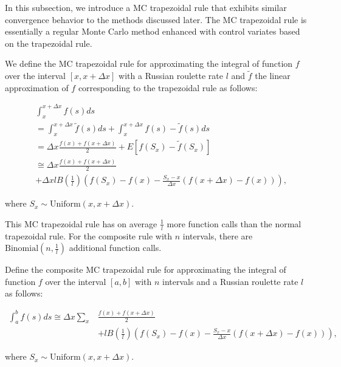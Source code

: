 \documentclass[a4paper,12pt]{article}
\begin{document}
In this subsection, we introduce a MC trapezoidal rule that
exhibits similar convergence behavior to the methods discussed later.
The MC trapezoidal rule is essentially a regular Monte Carlo method
enhanced with control variates based on the trapezoidal rule.

\begin{definition}
    We define the MC trapezoidal rule for approximating the integral
    of function $f$ over the interval $[x, x+\Delta x]$ with a Russian roulette rate
    $l$ and $\tilde{f}$ the linear approximation of $f$ corresponding
    to the trapezoidal rule as follows:

    \begin{align}
         & \int_{x}^{x+\Delta x} f(s) ds                 \\
         & = \int_{x}^{x+\Delta x}  \tilde{f}(s) ds +
        \int_{x}^{x+\Delta x}  f(s) - \tilde{f}(s) ds    \\
         & = \Delta x \frac{f(x) + f(x+\Delta x)}{2}
        + E \left[f(S_x) - \tilde{f}(S_x)\right]         \\
         & \cong \Delta x \frac{f(x) + f(x+\Delta x)}{2} \\
         & + \Delta x l B\left( \frac{1}{l}\right)
        \left(f(S_x) - f(x) - \frac{S_x - x}{\Delta x}
        \left(f(x+\Delta x) - f(x)\right) \right),
    \end{align}

    where $S_x \sim \text{Uniform}(x,x+\Delta x)$.
\end{definition}


This MC trapezoidal rule has on average $\frac{1}{l}$ more function calls than
the normal trapezoidal rule. For the composite rule with $n$ intervals,
there are $\text{Binomial}(n,\frac{1}{l})$ additional function calls.


\begin{definition} \label{MCtrap}
    Define the composite MC trapezoidal rule for approximating the integral
    of function $f$ over the interval $[a, b]$ with $n$ intervals
    and a Russian roulette rate $l$ as follows:

    \begin{align}
        \int_{a}^{b} f(s) ds \cong \Delta x \sum_{x} & \frac{f(x) + f(x+\Delta x)}{2} \\
                                                     & + l B\left(\frac{1}{l}\right)
        \left(f(S_x) - f(x) - \frac{S_x - x}{\Delta x}(f(x+\Delta x) - f(x))\right),
    \end{align}

    where $S_x \sim \text{Uniform}(x,x+\Delta x)$.

\end{definition}
\end{document}
